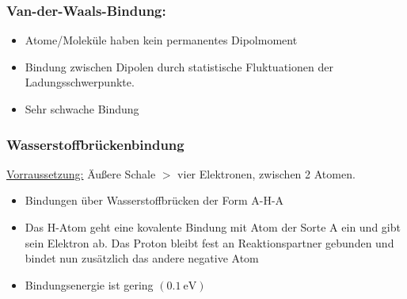 \documentclass[fs, footer]{latex4ei}
\begin{document}
\begin{multicols*}{4}
{\subsubsection{Van-der-Waals-Bindung:} 
        \begin{itemize}
        		\item Atome/Moleküle haben kein permanentes Dipolmoment 
				\item Bindung zwischen Dipolen durch statistische Fluktuationen der Ladungsschwerpunkte.
				\item Sehr schwache Bindung
		\end{itemize}
\subsubsection{Wasserstoffbrückenbindung}
	\underline{Vorraussetzung:} Äußere Schale $>$ vier Elektronen, zwischen 2 Atomen.
		\begin{itemize}
				\item Bindungen über Wasserstoffbrücken der Form A-H-A
				\item Das H-Atom geht eine kovalente Bindung mit Atom der Sorte A ein und gibt sein Elektron ab. Das Proton bleibt fest an Reaktionspartner gebunden und bindet nun zusätzlich das andere negative Atom
				\item Bindungsenergie ist gering $(\SI{0,1}{\electronvolt})$    
 		\end{itemize}
}








\end{multicols*}
\end{document}
